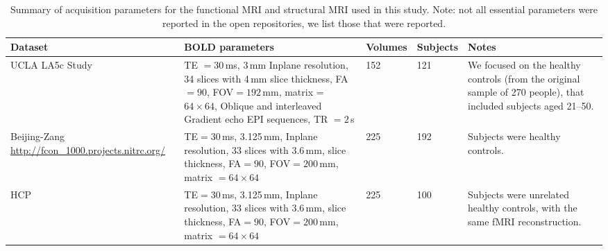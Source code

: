 \documentclass[oneside]{zHenriquesLab-StyleBioRxiv}
\begin{document}
\begin{table}[ht!]
\begin{center}
    \begin{tabular}{  p{2.5cm}  p{5cm}  l  p{1.5cm}  p{4cm} }
    \textbf{\sffamily Dataset} & \textbf{\sffamily BOLD parameters} & \textbf{\sffamily Volumes} & \textbf{\sffamily Subjects} & \textbf{\sffamily Notes} \\
    \hline
    UCLA LA5c Study \cite{poldrack2016phenome} & TE $=30$\,ms, 3\,mm Inplane resolution, 34 slices with 4\,mm slice thickness, FA$=90$, FOV$=192$\,mm, matrix = $64 \times 64$,
    Oblique and interleaved Gradient echo EPI sequences, TR $= 2$\,s & 152 & 121 & We focused on the healthy controls (from the original sample of 270 people), that included subjects aged 21--50.\\
    \hline
    Beijing-Zang \url{http://fcon_1000.projects.nitrc.org/} & TE$=30$\,ms, 3.125\,mm, Inplane resolution, 33 slices with 3.6\,mm, slice thickness, FA$=90$, FOV$=200$\,mm, matrix $=64 \times 64$ & 225 & 192 & Subjects were healthy controls. \\
    \hline
	HCP & TE$=30$\,ms, 3.125\,mm, Inplane resolution, 33 slices with 3.6\,mm, slice thickness, FA$=90$, FOV$=200$\,mm, matrix $=64 \times 64$ & 225 & 100 & Subjects were unrelated healthy controls, with the same fMRI reconstruction. \\
    \hline
    \end{tabular}
    \caption{Summary of acquisition parameters for the functional MRI and structural MRI used in this study.
	Note: not all essential parameters were reported in the open repositories, we list those that were reported.
    \label{tab:scanning_params}}
\end{center}
\end{table}
\end{document}
